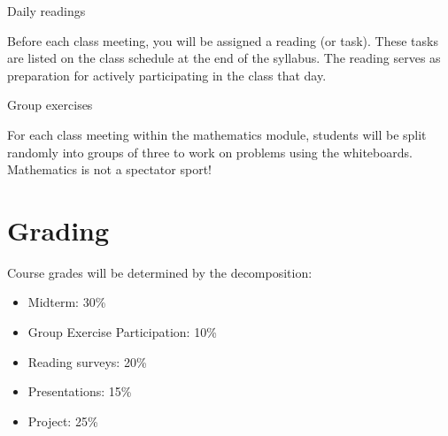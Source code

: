 \documentclass[letterpaper]{inzane_syllabus} %
\begin{document}

\vspace{0.1cm} 

{\color{myCOLOR} Daily readings}

Before each class meeting, you will be assigned a reading (or task). These tasks are listed on the class schedule at the end of the syllabus. The reading serves as preparation for actively participating in the class that day.  %


{\color{myCOLOR} Group exercises}

For each class meeting within the mathematics module, students will be split randomly into groups of three to work on problems using the whiteboards. Mathematics is not a spectator sport!


%



\newpage %


\makeFullPage

\section{Grading}

Course grades will be determined by the decomposition:
\begin{itemize}
\item Midterm: 30\% 
\item Group Exercise Participation: 10\%  
\item Reading surveys: 20\%
\item Presentations: 15\%
\item Project: 25\% 
\end{itemize}
\end{document}
